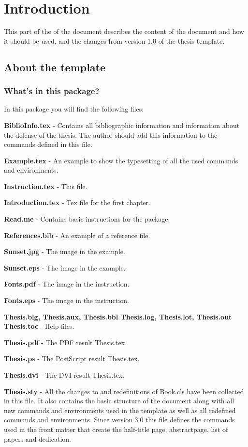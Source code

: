 \part{Introduction}%
This part of the of the document describes the content of the document and how it should be used, and the changes from version 1.0 of the thesis template.
\chapter{About the template}
\section{What's in this package?}
In this package you will find the following files:
\vspace{1em}
\begin{simplelist}
    \item \textbf{BiblioInfo.tex} - Contains all bibliographic information and information about the defense of the thesis. The author should add this information to the commands defined in this file.
    \item \textbf{Example.tex} - An example to show the typesetting of all the used commands and environments.
    \item \textbf{Instruction.tex} - This file.
    \item \textbf{Introduction.tex} - Tex file for the first chapter.
    \item \textbf{Read.me} - Contains basic instructions for the package.
    \item \textbf{References.bib} - An example of a reference file.
    \item \textbf{Sunset.jpg} - The image in the example.
    \item \textbf{Sunset.eps} - The image in the example.
    \item \textbf{Fonts.pdf} - The image in the instruction.
    \item \textbf{Fonts.eps} - The image in the instruction.    
    \item \textbf{Thesis.blg, Thesis.aux, Thesis.bbl Thesis.log, Thesis.lot, Thesis.out Thesis.toc} - Help files.
    \item \textbf{Thesis.pdf} - The PDF result Thesis.tex.
    \item \textbf{Thesis.ps} - The PostScript result Thesis.tex.
    \item \textbf{Thesis.dvi} - The DVI result Thesis.tex.
    \item \textbf{Thesis.sty} - All the changes to and redefinitions of Book.cls have been collected in this file. It also contains the basic structure of the document along with all new commands and environments used in the template as well as all redefined commands and environments. Since version 3.0 this file defines the commands used in the front matter that create the half-title page, abstractpage, list of papers and dedication.   

\end{simplelist}
